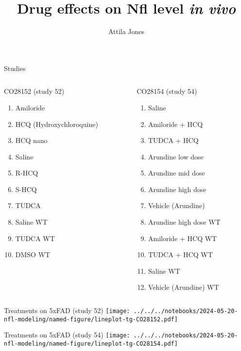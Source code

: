 \documentclass[aspectratio=169]{beamer}
\title{Drug effects on Nfl level \emph{in vivo}}
\subtitle{}
\author{Attila Jones}
\date{}
\begin{document}
\titlepage

\begin{frame}{Studies}
\begin{columns}[t]
\begin{column}{0.5\textwidth}
  CO28152 (study 52)
\begin{enumerate}
      \item Amiloride
      \item HCQ (Hydroxychloroquine)
      \item HCQ nano
      \item Saline
      \item R-HCQ
      \item S-HCQ
      \item TUDCA
      \item Saline WT
      \item TUDCA WT
      \item DMSO WT
\end{enumerate}
\end{column}
\begin{column}{0.5\textwidth}
  CO28154 (study 54)
\begin{enumerate}
  \item Saline
  \item Amiloride + HCQ
  \item TUDCA + HCQ
  \item Arundine low dose
  \item Arundine mid dose
  \item Arundine high dose
  \item Vehicle (Arundine)
  \item Arundine high dose WT
  \item Amiloride + HCQ WT
  \item TUDCA + HCQ WT
  \item Saline WT
  \item Vehicle (Arundine) WT
\end{enumerate}
\end{column}
\end{columns}
\end{frame}


\begin{frame}{Treatments on 5xFAD (study 52)}
  \texttt{[image: ../../../notebooks/2024-05-20-nfl-modeling/named-figure/lineplot-tg-CO28152.pdf]}
\end{frame}

\begin{frame}{Treatments on 5xFAD (study 54)}
  \texttt{[image: ../../../notebooks/2024-05-20-nfl-modeling/named-figure/lineplot-tg-CO28154.pdf]}
\end{frame}
\end{document}
